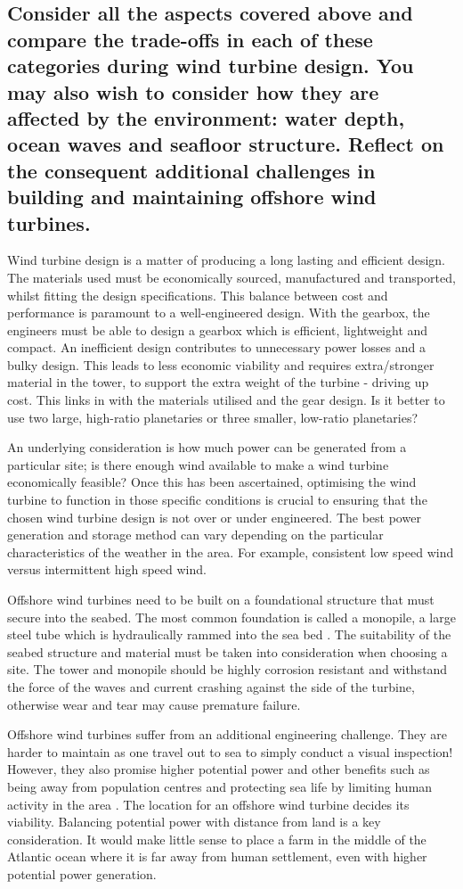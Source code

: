 \documentclass[12pt]{article}
\numberwithin{equation}{section}
\begin{document}
\begin{flushleft}
\subsection*{Consider all the aspects covered above and compare the trade-offs in each of these categories during wind turbine design. You may also wish to consider how they are affected by the environment: water depth, ocean waves and seafloor structure. Reflect on the consequent additional challenges in building and maintaining offshore wind turbines.}
Wind turbine design is a matter of producing a long lasting and efficient design. The materials used must be economically sourced, manufactured and transported, whilst fitting the design specifications. This balance between cost and performance is paramount to a well-engineered design. With the gearbox, the engineers must be able to design a gearbox which is efficient, lightweight and compact. An inefficient design contributes to unnecessary power losses and a bulky design. This leads to less economic viability and requires extra/stronger material in the tower, to support the extra weight of the turbine - driving up cost. This links in with the materials utilised and the gear design. Is it better to use two large, high-ratio planetaries or three smaller, low-ratio planetaries? 

An underlying consideration is how much power can be generated from a particular site; is there enough wind available to make a wind turbine economically feasible? Once this has been ascertained, optimising the wind turbine to function in those specific conditions is crucial to ensuring that the chosen wind turbine design is not over or under engineered. The best power generation and storage method can vary depending on the particular characteristics of the weather in the area. For example, consistent low speed wind versus intermittent high speed wind. 

Offshore wind turbines need to be built on a foundational structure that must secure into the seabed. The most common foundation is called a monopile, a large steel tube which is hydraulically rammed into the sea bed \citep{monopile}. The suitability of the seabed structure and material must be taken into consideration when choosing a site. The tower and monopile should be highly corrosion resistant and withstand the force of the waves and current crashing against the side of the turbine, otherwise wear and tear may cause premature failure.

Offshore wind turbines suffer from an additional engineering challenge. They are harder to maintain as one travel out to sea to simply conduct a visual inspection! However, they also promise higher potential power and other benefits such as being away from population centres and protecting sea life by limiting human activity in the area \citep{offshorePower}. The location for an offshore wind turbine decides its viability. Balancing potential power with distance from land is a key consideration. It would make little sense to place a farm in the middle of the Atlantic ocean where it is far away from human settlement, even with higher potential power generation. 



\end{flushleft}
\end{document}
